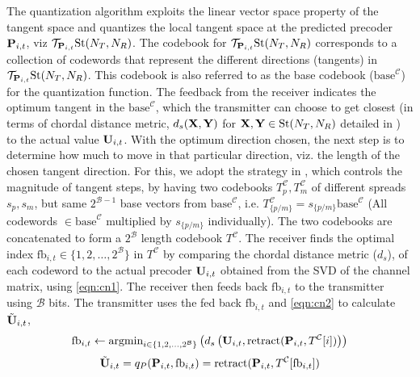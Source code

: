 \documentclass[conference]{IEEEtran}
\begin{document}
The quantization algorithm exploits the linear vector space property of the tangent space and quantizes the local tangent space at the predicted precoder ${\bf P}_{i,t}$, viz $\mathcal{T}_{{\bf P}_{i,t}} \text{St}(N_T,N_R)$.
The codebook for $\mathcal{T}_{{\bf P}_{i,t}} \text{St}(N_T,N_R)$ corresponds to a collection of codewords that represent the different directions (tangents) in $\mathcal{T}_{{\bf P}_{i,t}} \text{St}(N_T,N_R)$.
This codebook is also referred to as the base codebook ($\text{base}^{\mathcal{C}}$) for the quantization function.
The feedback from the receiver indicates the optimum tangent in the $\text{base}^{\mathcal{C}}$, which the transmitter can choose to get closest (in terms of chordal distance metric, $d_s({\bf X},{\bf Y})$ for ${\bf X},{\bf Y} \in \text{St}(N_T,N_R)$ detailed in \cite{Gupt1905:Predictive,6891198}) to the actual value ${\bf U}_{i,t}$.
With the optimum direction chosen, the next step is to determine how much to move in that particular direction, viz. the length of the chosen tangent direction.
For this, we adopt the strategy in \cite{6891198}, which
controls the magnitude of tangent steps, by having two codebooks
$T^{\mathcal{C}}_p,T^{\mathcal{C}}_m$ of different spreads $s_p,s_m$, but same $2^{\mathcal{B}-1}$ base vectors from $\text{base}^{\mathcal{C}}$, i.e. $T^{\mathcal{C}}_{\{p/m\}}=s_{\{p/m\}}\text{base}^{\mathcal{C}}$ (All codewords $\in \text{base}^{\mathcal{C}}$ multiplied by $s_{\{p/m\}}$ individually).
The two codebooks are concatenated to form a $2^\mathcal{B}$ length codebook $T^\mathcal{C}$.
The receiver finds the optimal index $\text{fb}_{i,t} \in \{1,2,\ldots,2^{\mathcal{B}}\}$ in $T^\mathcal{C}$ by comparing the chordal distance metric ($d_s$), of each codeword to the actual precoder ${\bf U}_{i,t}$ obtained from the SVD of the channel matrix, using \eqref{eqn:cn1}. The receiver then feeds back $\text{fb}_{i,t}$ to the transmitter using $\mathcal{B}$ bits. The transmitter uses the fed back $\text{fb}_{i,t}$ and \eqref{eqn:cn2} to calculate $\tilde{{\bf U}}_{i,t}$,
\begin{equation}
\label{eqn:cn1}
\text{fb}_{i,t} \gets \text{argmin}_{i \in \{1,2,\ldots,2^{\mathcal{B}}\}}\left (d_s\left (\bU_{i,t},\text{retract}(\bP_{i,t},T^\mathcal{C}[i])\right ) \right)
\end{equation}
\begin{equation}
\tilde{\bU}_{i,t}=q_P(\bP_{i,t},\text{fb}_{i,t})=\text{retract}(\bP_{i,t},T^\mathcal{C}[\text{fb}_{i,t}])
\label{eqn:cn2}
\end{equation}
\end{document}
